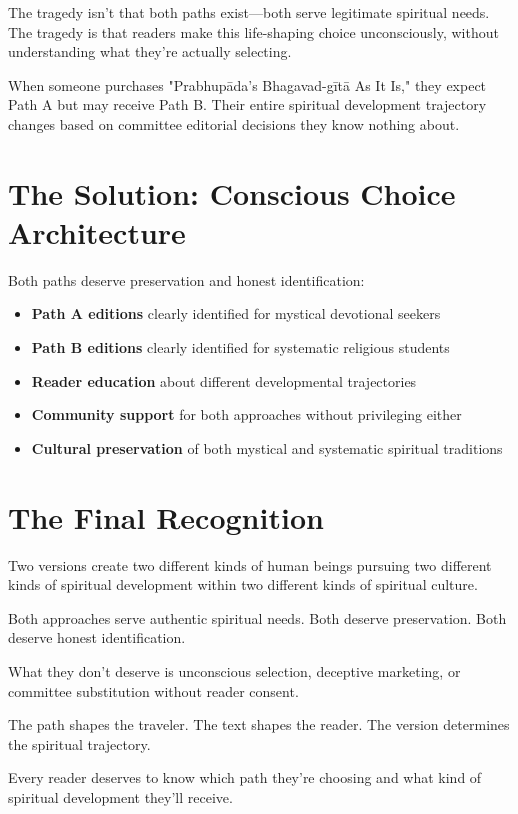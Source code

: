 \documentclass[11pt,twoside]{book}
\begin{document}
The tragedy isn't that both paths exist—both serve legitimate spiritual needs. The tragedy is that readers make this life-shaping choice unconsciously, without understanding what they're actually selecting.

When someone purchases "Prabhupāda's Bhagavad-gītā As It Is," they expect Path A but may receive Path B. Their entire spiritual development trajectory changes based on committee editorial decisions they know nothing about.
\section*{The Solution: Conscious Choice Architecture}
\label{sec:org9bde572}

Both paths deserve preservation and honest identification:

\begin{itemize}
\item \textbf{\textbf{Path A editions}} clearly identified for mystical devotional seekers
\item \textbf{\textbf{Path B editions}} clearly identified for systematic religious students
\item \textbf{\textbf{Reader education}} about different developmental trajectories
\item \textbf{\textbf{Community support}} for both approaches without privileging either
\item \textbf{\textbf{Cultural preservation}} of both mystical and systematic spiritual traditions
\end{itemize}
\section*{The Final Recognition}
\label{sec:orgcf8d05c}

Two versions create two different kinds of human beings pursuing two different kinds of spiritual development within two different kinds of spiritual culture.

Both approaches serve authentic spiritual needs. Both deserve preservation. Both deserve honest identification.

What they don't deserve is unconscious selection, deceptive marketing, or committee substitution without reader consent.

The path shapes the traveler. The text shapes the reader. The version determines the spiritual trajectory.

Every reader deserves to know which path they're choosing and what kind of spiritual development they'll receive.
\end{document}
